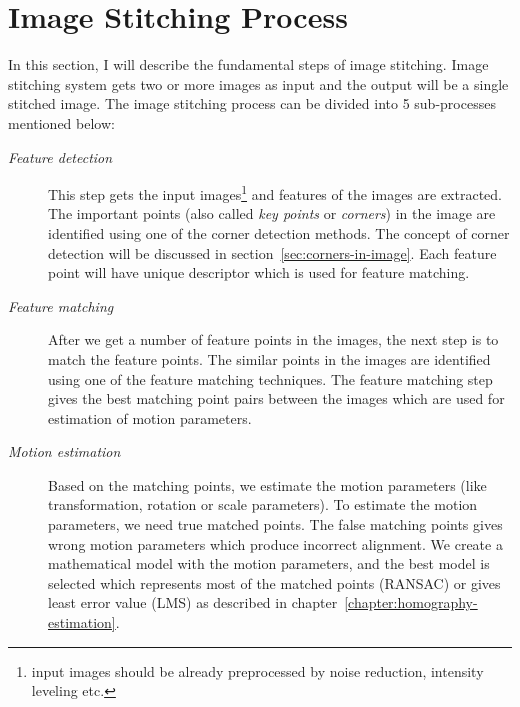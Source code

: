 \section{Image Stitching Process}
In this section, I will describe the fundamental steps of image stitching. Image stitching system gets two or more images as input and the output will be a single stitched image. The image stitching process can be divided into 5 sub-processes mentioned below:
\begin{description}
\item [\textit{Feature detection}]
This step gets the input images\footnote{input images should be already preprocessed by noise reduction, intensity leveling etc.} and features of the images are extracted. The important points (also called \textit{key points} or \textit{corners}) in the image are identified using one of the corner detection methods. The concept of corner detection will be discussed in section~\ref{sec:corners-in-image}. Each feature point will have unique descriptor which is used for feature matching.   

\item [\textit{Feature matching}]
After we get a number of feature points in the images, the next step is to match the feature points. The similar points in the images are identified using one of the feature matching techniques. %
The feature matching step gives the best matching point pairs between the images which are used for estimation of motion parameters.




\item [\textit{Motion estimation}]
Based on the matching points, we estimate the motion parameters (like transformation, rotation or scale parameters). To estimate the motion parameters, we need true matched points. The false matching points gives wrong motion parameters which produce incorrect alignment. We create a mathematical model with the motion parameters, and the best model is selected which represents most of the matched points (RANSAC) or gives least error value (LMS) as described in chapter~\ref{chapter:homography-estimation}.   
 

\end{description}
